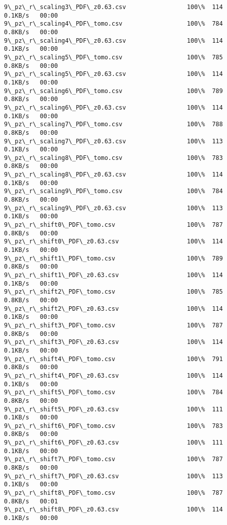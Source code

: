 \documentclass[11pt]{article}
\begin{document}
\begin{Verbatim}[commandchars=\\\{\}]
9\_pz\_r\_scaling3\_PDF\_z0.63.csv                 100\%  114     0.1KB/s   00:00    
9\_pz\_r\_scaling4\_PDF\_tomo.csv                  100\%  784     0.8KB/s   00:00    
9\_pz\_r\_scaling4\_PDF\_z0.63.csv                 100\%  114     0.1KB/s   00:00    
9\_pz\_r\_scaling5\_PDF\_tomo.csv                  100\%  785     0.8KB/s   00:00    
9\_pz\_r\_scaling5\_PDF\_z0.63.csv                 100\%  114     0.1KB/s   00:00    
9\_pz\_r\_scaling6\_PDF\_tomo.csv                  100\%  789     0.8KB/s   00:00    
9\_pz\_r\_scaling6\_PDF\_z0.63.csv                 100\%  114     0.1KB/s   00:00    
9\_pz\_r\_scaling7\_PDF\_tomo.csv                  100\%  788     0.8KB/s   00:00    
9\_pz\_r\_scaling7\_PDF\_z0.63.csv                 100\%  113     0.1KB/s   00:00    
9\_pz\_r\_scaling8\_PDF\_tomo.csv                  100\%  783     0.8KB/s   00:00    
9\_pz\_r\_scaling8\_PDF\_z0.63.csv                 100\%  114     0.1KB/s   00:00    
9\_pz\_r\_scaling9\_PDF\_tomo.csv                  100\%  784     0.8KB/s   00:00    
9\_pz\_r\_scaling9\_PDF\_z0.63.csv                 100\%  113     0.1KB/s   00:00    
9\_pz\_r\_shift0\_PDF\_tomo.csv                    100\%  787     0.8KB/s   00:00    
9\_pz\_r\_shift0\_PDF\_z0.63.csv                   100\%  114     0.1KB/s   00:00    
9\_pz\_r\_shift1\_PDF\_tomo.csv                    100\%  789     0.8KB/s   00:00    
9\_pz\_r\_shift1\_PDF\_z0.63.csv                   100\%  114     0.1KB/s   00:00    
9\_pz\_r\_shift2\_PDF\_tomo.csv                    100\%  785     0.8KB/s   00:00    
9\_pz\_r\_shift2\_PDF\_z0.63.csv                   100\%  114     0.1KB/s   00:00    
9\_pz\_r\_shift3\_PDF\_tomo.csv                    100\%  787     0.8KB/s   00:00    
9\_pz\_r\_shift3\_PDF\_z0.63.csv                   100\%  114     0.1KB/s   00:00    
9\_pz\_r\_shift4\_PDF\_tomo.csv                    100\%  791     0.8KB/s   00:00    
9\_pz\_r\_shift4\_PDF\_z0.63.csv                   100\%  114     0.1KB/s   00:00    
9\_pz\_r\_shift5\_PDF\_tomo.csv                    100\%  784     0.8KB/s   00:00    
9\_pz\_r\_shift5\_PDF\_z0.63.csv                   100\%  111     0.1KB/s   00:00    
9\_pz\_r\_shift6\_PDF\_tomo.csv                    100\%  783     0.8KB/s   00:00    
9\_pz\_r\_shift6\_PDF\_z0.63.csv                   100\%  111     0.1KB/s   00:00    
9\_pz\_r\_shift7\_PDF\_tomo.csv                    100\%  787     0.8KB/s   00:00    
9\_pz\_r\_shift7\_PDF\_z0.63.csv                   100\%  113     0.1KB/s   00:00    
9\_pz\_r\_shift8\_PDF\_tomo.csv                    100\%  787     0.8KB/s   00:01    
9\_pz\_r\_shift8\_PDF\_z0.63.csv                   100\%  114     0.1KB/s   00:00    

\end{Verbatim}
\end{document}
